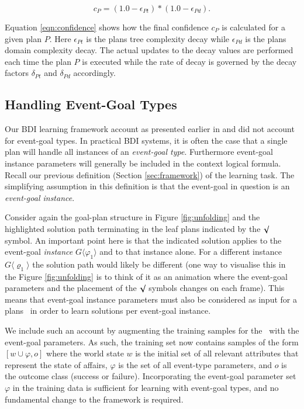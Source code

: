 \begin{equation}\label{eqn:confidence}   
c_P = (1.0 - \epsilon_{Pt}) * (1.0 - \epsilon_{Pd}).
\end{equation}

Equation \ref{eqn:confidence} shows how the final confidence $c_P$ is calculated for a given plan $P$. Here $\epsilon_{Pt}$ is the plans tree complexity decay while $\epsilon_{Pd}$ is the plans domain complexity decay. The actual updates to the decay values are performed each time the plan $P$ is executed while the rate of decay is governed by the decay factors $\delta_{Pt}$ and $\delta_{Pd}$ accordingly.


\subsection{Handling Event-Goal Types}

Our BDI learning framework account as presented earlier in \cite{Airiau:IJAT:09} and \cite{Singh:AAMAS10} did not account for event-goal types. In practical BDI systems, it is often the case that a single plan will handle all instances of an \textit{event-goal type}. Furthermore event-goal instance parameters will generally be included in the context logical formula. Recall our previous definition (Section \ref{sec:framework}) of the learning task. The simplifying assumption in this definition is that the event-goal in question is an \textit{event-goal instance}. 

Consider again the goal-plan structure in Figure \ref{fig:unfolding} and the highlighted solution path terminating in the leaf plans indicated by the $\surd$ symbol. An important point here is that the indicated solution applies to the event-goal \textit{instance} $G\langle\varphi_1\rangle$ and to that instance alone. For a different instance $G\langle\varrho_1\rangle$ the solution path would likely be different (one way to visualise this in the Figure \ref{fig:unfolding} is to think of it as an animation where the event-goal parameters and the placement of the $\surd$ symbols changes on each frame).  This means that event-goal instance parameters must also be considered as input for a plans \dt\ in order to learn solutions per event-goal instance.

We include such an account by augmenting the training samples for the \dt\ with the event-goal parameters. As such, the training set now contains samples of the form $[w \cup \varphi,o]$ where the world state $w$ is the initial set of all relevant attributes that represent the state of affairs, $\varphi$ is the set of all event-type parameters, and $o$ is the outcome class (success or failure). Incorporating the event-goal parameter set $\varphi$ in the training data is sufficient for learning with event-goal types, and no fundamental change to the framework is required.

